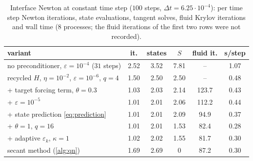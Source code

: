 \documentclass[11pt,a4paper]{article}
\theoremstyle{definition}
\theoremstyle{remark}
\begin{document}
\begin{table}[ht]\centering
\caption{Interface Newton at constant time step ($100$ steps, $\Delta t=6.25\cdot10^{-4}$): per time
step Newton iterations, state evaluations, tangent solves, fluid Krylov iterations and wall time
($8$ processes; the fluid iterations of the first two rows were not recorded).}
\label{tab:fast_progress}
\small
\begin{tabular}{lccccc}
\toprule
variant & it. & states & $S$ & fluid it. & s/step\\
\midrule
no preconditioner, $\varepsilon=10^{-4}$ ($31$ steps) & 2.52 & 3.52 & 7.81 & -- & 1.07\\
recycled $H$, $\eta=10^{-2}$, $\varepsilon=10^{-6}$, $q=4$ & 1.50 & 2.50 & 2.50 & -- & 0.48\\
+ target forcing term, $\theta=0.3$ & 1.03 & 2.03 & 2.14 & 123.7 & 0.43\\
+ $\varepsilon=10^{-5}$ & 1.01 & 2.01 & 2.06 & 112.2 & 0.44\\
+ state prediction \eqref{eq:prediction} & 1.01 & 2.01 & 2.09 & 94.9 & 0.37\\
+ $\theta=1$, $q=16$ & 1.01 & 2.01 & 1.53 & 82.4 & 0.28\\
+ adaptive $\varepsilon_k$, $\kappa=1$ & 1.02 & 2.02 & 1.55 & 81.7 & 0.30\\
\midrule
secant method (\cref{alg:qn}) & 1.69 & 2.69 & 0 & 87.2 & 0.30\\
\bottomrule
\end{tabular}
\end{table}
\end{document}
